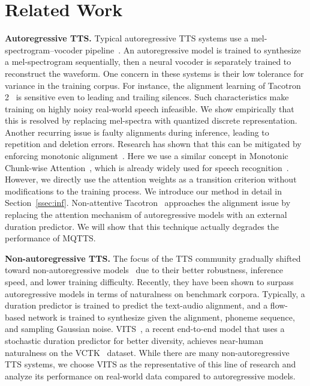\documentclass[letterpaper]{article}
\begin{document}
\section{Related Work}

\textbf{Autoregressive TTS.}
Typical autoregressive TTS systems use a mel-spectrogram--vocoder pipeline~\cite{8461368,Li_Liu_Liu_Zhao_Liu_2019}.
An autoregressive model is trained to synthesize a mel-spectrogram sequentially, then a neural vocoder is separately trained  to reconstruct the waveform.
One concern in these systems is their low tolerance for variance  in the training corpus.
For instance, the alignment learning of Tacotron 2~\cite{8461368} is sensitive even to leading and trailing silences.
Such characteristics make training on highly noisy real-world speech infeasible.
We show empirically that this is resolved by replacing mel-spectra with quantized discrete representation.
Another recurring issue is faulty alignments during inference, leading to repetition and deletion errors.
Research has shown that this can be mitigated by enforcing monotonic alignment~\cite{DBLP:conf/interspeech/HeDH19,DBLP:journals/corr/abs-2103-16710}.
Here we use a similar concept in Monotonic Chunk-wise Attention~\cite{DBLP:conf/iclr/ChiuR18}, which is already widely used for speech recognition~\cite{DBLP:journals/corr/abs-2005-00205}.
However, we directly use the attention weights as a transition criterion without modifications to the training process.
We introduce our method in detail in Section~\ref{ssec:inf}.
Non-attentive Tacotron~\cite{DBLP:journals/corr/abs-2010-04301} approaches the alignment issue by replacing the attention mechanism of autoregressive models with an external duration predictor.
We will show that this technique actually degrades the performance of MQTTS.

\textbf{Non-autoregressive TTS.}
The focus of the TTS community gradually shifted toward non-autoregressive models~\cite{ pmlr-v139-kim21f,NEURIPS2020_5c3b99e8,NEURIPS2019_f63f65b5} due to their better robustness, inference speed, and lower training difficulty.
Recently, they have been shown to surpass autoregressive models in terms of naturalness on benchmark corpora.
Typically, a duration predictor is trained to predict the text-audio alignment, and a flow-based network is trained to synthesize given the alignment, phoneme sequence, and sampling Gaussian noise.
VITS~\cite{pmlr-v139-kim21f}, a recent end-to-end model that uses a stochastic duration predictor for better diversity, achieves near-human naturalness on the VCTK~\cite{VCTK} dataset.
While there are many non-autoregressive TTS systems, we choose VITS as the representative of this line of research and analyze its performance on real-world data compared to autoregressive models.
\end{document}
